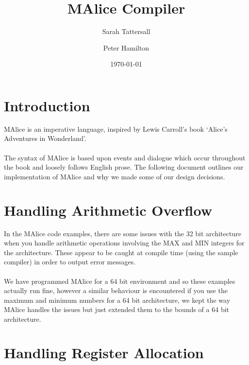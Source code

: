 \documentclass[a4wide, 11pt]{article}
\begin{document}
\title{MAlice Compiler}

\author{Sarah Tattersall \and Peter Hamilton}

\date{\today}         %

\maketitle            %

\pagebreak

\section{Introduction}
MAlice is an imperative language, inspired by Lewis Carroll's book `Alice's Adventures in Wonderland'.
\\\\
The syntax of MAlice is based upon events and dialogue which occur throughout the book and loosely follows English prose. The following document outlines our implementation of MAlice and why we made some of our design decisions.

\section{Handling Arithmetic Overflow}
In the MAlice code examples, there are some issues with the 32 bit architecture when you handle arithmetic operations involving the MAX and MIN integers for the architecture. These appear to be caught at compile time (using the sample compiler) in order to output error messages.
\\\\
We have programmed MAlice for a 64 bit environment and so these examples actually run fine, however a similar behaviour is encountered if you use the maximum and minimum numbers for a 64 bit architecture, we kept the way MAlice handles the issues but just extended them to the bounds of a 64 bit architecture.

\section{Handling Register Allocation}
\end{document}
